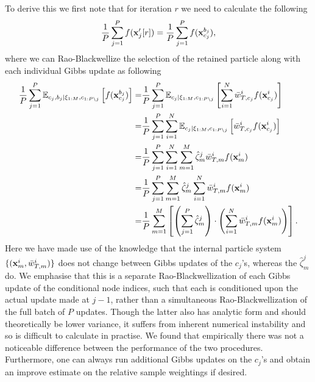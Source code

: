 To derive this we first note that for iteration $r$ we need to calculate the following
\begin{align*}
\frac{1}{P}\sum_{j=1}^P f(\mathbf{x}_j'[r]) = \frac{1}{P}\sum_{j=1}^P f(\mathbf{x}_{c_j}^{b_j}),
\end{align*}
where we can Rao-Blackwellize the selection of the retained particle along with each individual Gibbs update as following
\begin{align*}
\frac{1}{P}\sum_{j=1}^P \mathbb{E}_{c_j, b_j | \xi_{1:M}, c_{1:P \backslash j}}\left[f(\mathbf{x}_{c_j}^{b_j}) \right] =& \frac{1}{P}\sum_{j=1}^P \mathbb{E}_{c_j | \xi_{1:M}, c_{1:P \backslash j}}\left[\sum_{i=1}^N \bar w_{T,c_j}^i  f(\mathbf{x}_{c_j}^{i}) \right] \\ =& \frac{1}{P}\sum_{j=1}^P \sum_{i=1}^N \mathbb{E}_{c_j | \xi_{1:M}, c_{1:P \backslash j}}\left[\bar w_{T,c_j}^i  f(\mathbf{x}_{c_j}^{i}) \right] \\
=& \frac{1}{P}\sum_{j=1}^P \sum_{i=1}^N \sum_{m=1}^M \hat \zeta_m^j \bar w_{T,m}^i  f(\mathbf{x}_{m}^{i}) \\=& \frac{1}{P}\sum_{j=1}^P \sum_{m=1}^M \hat \zeta_m^j \sum_{i=1}^N \bar w_{T,m}^i  f(\mathbf{x}_{m}^{i})
\\=& \frac{1}{P} \sum_{m=1}^M  \left[\left(\sum_{j=1}^P \hat \zeta_m^j \right) \cdot \left(\sum_{i=1}^N \bar w_{T,m}^i  f(\mathbf{x}_{m}^{i}) \right)\right].
\end{align*}
Here we have made use of the knowledge that the internal particle system $\{(\mathbf{x}_{m}^{i},\bar w_{T,m}^i)\}$ does not change between Gibbs updates of the $c_j$'s, whereas the $\hat \zeta_m^j$ do.  We emphasise that this is a separate Rao-Blackwellization of each Gibbs update of the conditional node indices, such that each is conditioned upon the actual update made at $j-1$, rather than a simultaneous Rao-Blackwellization of the full batch of $P$ updates.  Though the latter also has analytic form and should theoretically be lower variance, it suffers from inherent numerical instability and so is difficult to calculate in practise.  We found that empirically there was not a noticeable difference between the performance of the two procedures.  Furthermore, one can always run additional Gibbs updates on the $c_j$'s and obtain an improve estimate on the relative sample weightings if desired.

